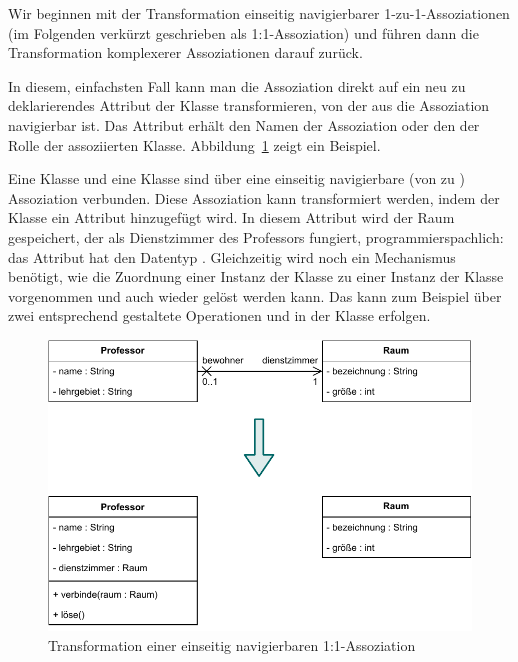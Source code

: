 \vspace{2mm} %

Wir beginnen mit der Transformation einseitig navigierbarer 1-zu-1-Assoziationen (im Folgenden verkürzt geschrieben als 1:1-Assoziation) und führen dann die Transformation komplexerer Assoziationen darauf zurück.

\clearpage %


\vspace{2mm} %

In diesem, einfachsten Fall kann man die Assoziation direkt auf ein neu zu deklarierendes Attribut der Klasse transformieren, von der aus die Assoziation navigierbar ist. Das Attribut erhält den Namen der Assoziation oder den der Rolle der assoziierten Klasse. Abbildung~\ref{fig:transformationen_abb_a} zeigt ein Beispiel.

\vspace{2mm} %

Eine Klasse  und eine Klasse  sind über eine einseitig navigierbare (von  zu ) Assoziation verbunden. Diese Assoziation kann transformiert werden, indem der Klasse  ein Attribut  hinzugefügt wird. In diesem Attribut wird der Raum gespeichert, der als Dienstzimmer des Profes\-sors fungiert, programmierspachlich: das Attribut  hat den Daten\-typ . Gleichzeitig wird noch ein Mechanismus benötigt, wie die Zuordnung einer Instanz der Klasse  zu einer Instanz der Klasse  vorgenommen und auch wieder gelöst werden kann. Das kann zum Beispiel über zwei entsprechend gestaltete Operationen  und  in der Klasse  erfolgen.

\begin{figure}[h!]
	\centering
	\includegraphics[scale=1.0]{Bilder/Kapitel-9/transformationen_abb_a.pdf}
	\vspace{\baselineskip} %
	\caption{Transformation einer einseitig navigierbaren 1:1-Assoziation}
	\label{fig:transformationen_abb_a}
\end{figure}


